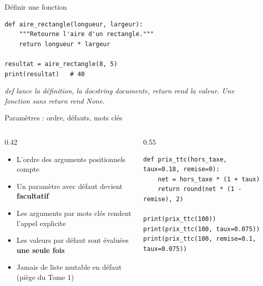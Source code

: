 \documentclass[aspectratio=169,11pt]{beamer}
\begin{document}
\begin{frame}[fragile]{Définir une fonction}

\begin{lstlisting}[style=py]
def aire_rectangle(longueur, largeur):
    """Retourne l'aire d'un rectangle."""
    return longueur * largeur

resultat = aire_rectangle(8, 5)
print(resultat)   # 40
\end{lstlisting}
\vspace{0.5pt}

{\small\color{PyGris}\itshape def lance la définition, la docstring documente, return rend la valeur. Une fonction sans return rend None.}

\end{frame}

\begin{frame}[fragile]{Paramètres : ordre, défauts, mots clés}
\begin{columns}[t]
\begin{column}{0.42\textwidth}
\begin{itemize}
  \setlength{\itemsep}{1.5pt}\setlength{\parskip}{0pt}
  \item L'ordre des arguments positionnels compte
  \item Un paramètre avec défaut devient \textbf{facultatif}
  \item Les arguments par mots clés rendent l'appel explicite
  \item Les valeurs par défaut sont évaluées \textbf{une seule fois}
  \item Jamais de liste mutable en défaut (piège du Tome 1)
\end{itemize}
\end{column}
\hspace{0.02\textwidth}
\begin{column}{0.55\textwidth}
\begin{lstlisting}[style=pysmall]
def prix_ttc(hors_taxe, taux=0.18, remise=0):
    net = hors_taxe * (1 + taux)
    return round(net * (1 - remise), 2)

print(prix_ttc(100))
print(prix_ttc(100, taux=0.075))
print(prix_ttc(100, remise=0.1, taux=0.075))
\end{lstlisting}
\end{column}
\end{columns}
\end{frame}
\end{document}
